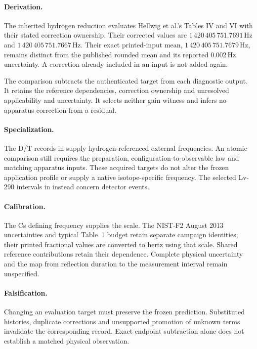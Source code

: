 \paragraph{Derivation.}
The inherited hydrogen reduction evaluates Hellwig et al.'s Tables IV and VI
with their stated correction ownership. Their corrected values are
\(1\,420\,405\,751.7691\,\mathrm{Hz}\) and
\(1\,420\,405\,751.7667\,\mathrm{Hz}\). Their exact printed-input mean,
\(1\,420\,405\,751.7679\,\mathrm{Hz}\), remains distinct from the published
rounded mean and its reported \(0.002\,\mathrm{Hz}\) uncertainty. A correction
already included in an input is not added again.

The comparison subtracts the authenticated target from each diagnostic output.
It retains the reference dependencies, correction ownership and unresolved
applicability and uncertainty. It selects neither gain witness and infers no
apparatus correction from a residual.

\paragraph{Specialization.}
The D/T records in  supply hydrogen-referenced
external frequencies. An atomic comparison still requires the preparation,
configuration-to-observable law and matching apparatus inputs. These acquired
targets do not alter the frozen application profile or supply a native
isotope-specific frequency. The selected Lv-290 intervals in
 instead concern detector events.

\paragraph{Calibration.}
The Cs defining frequency supplies the scale. The NIST-F2 August 2013
uncertainties and typical Table~1 budget retain separate campaign identities;
their printed fractional values are converted to hertz using that scale.
Shared reference contributions retain their dependence. Complete physical
uncertainty and the map from reflection duration to the measurement interval
remain unspecified.

\paragraph{Falsification.}
Changing an evaluation target must preserve the frozen prediction. Substituted
histories, duplicate corrections and unsupported promotion of unknown terms
invalidate the corresponding record. Exact endpoint subtraction alone does
not establish a matched physical observation.


